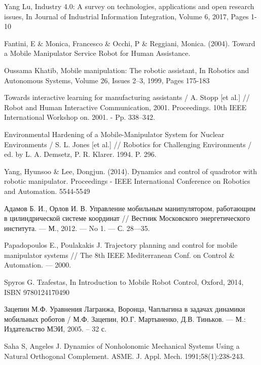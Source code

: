 \documentclass[14pt, a4paper]{extreport}
\begin{document}
\renewcommand\bibname{\Large{Список использованных источников}}
\begin{thebibliography}{99}
\vspace{-1cm}
{\small
 Yang Lu, Industry 4.0: A survey on technologies, applications and open research issues, In Journal of Industrial Information Integration, Volume 6, 2017, Pages 1-10

 Fantini, E \& Monica, Francesco \& Occhi, P \& Reggiani, Monica. (2004). Toward a Mobile Manipulator Service Robot for Human Assistance.

 Oussama Khatib, Mobile manipulation: The robotic assistant, In Robotics and Autonomous Systems, Volume 26, Issues 2–3, 1999, Pages 175-183

 Towards interactive learning for manufacturing assistants / A. Stopp [et al.] // Robot and
Human Interactive Communication, 2001. Proceedings. 10th IEEE International Workshop
on.  2001. - Pp. 338–342.

 Environmental Hardening of a Mobile-Manipulator System for Nuclear Environments / S. L.
Jones [et al.] // Robotics for Challenging Environments / ed. by L. A. Demsetz, P. R. Klarer. 
1994.  P. 296.

 Yang, Hyunsoo \& Lee, Dongjun. (2014). Dynamics and control of quadrotor with robotic manipulator. Proceedings - IEEE International Conference on Robotics and Automation. 5544-5549

 Адамов Б. И., Орлов И. В. Управление мобильным манипулятором, работающим в цилиндрической системе координат // Вестник Московского энергетического института. — М., 2012. — No 1. — С. 28—35.

 Papadopoulos E., Poulakakis J. Trajectory planning and control for mobile manipulator systems // The 8th IEEE Mediterranean Conf. on Control \& Automation. — 2000.

 Spyros G. Tzafestas, In Introduction to Mobile Robot Control, Oxford, 2014, ISBN 9780124170490

 Зацепин М.Ф. Уравнения Лагранжа, Воронца, Чаплыгина в задачах динамики мобильных роботов / М.Ф. Зацепин, Ю.Г. Мартыненко, Д.В. Тиньков. --- М.: Издательство МЭИ, 2005. – 32 с.

 Saha S, Angeles J. Dynamics of Nonholonomic Mechanical Systems Using a Natural Orthogonal Complement. ASME. J. Appl. Mech. 1991;58(1):238-243. 

}
\end{thebibliography}
\end{document}
